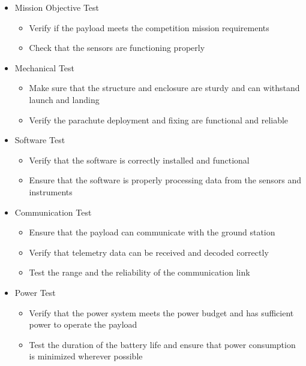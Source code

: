 \documentclass[11pt]{article}
\begin{document}
\begin{itemize}[leftmargin=1cm, itemindent=0.25cm, noitemsep, topsep=0pt, label=]
\item Mission Objective Test
\begin{itemize}[label=, noitemsep, topsep=2pt]
\item Verify if the payload meets the competition mission requirements
\item Check that the sensors are functioning properly
\end{itemize}

\item Mechanical Test
\begin{itemize}[label=, noitemsep, topsep=2pt]
\item Make sure that the structure and enclosure are sturdy and can withstand launch and landing
\item Verify the parachute deployment and fixing are functional and reliable
\end{itemize}

\item Software Test
\begin{itemize}[label=, noitemsep, topsep=2pt]
\item Verify that the software is correctly installed and functional
\item Ensure that the software is properly processing data from the sensors and instruments
\end{itemize}

\item Communication Test
\begin{itemize}[label=, noitemsep, topsep=2pt]
\item Ensure that the payload can communicate with the ground station
\item Verify that telemetry data can be received and decoded correctly
\item Test the range and the reliability of the communication link
\end{itemize}

\item Power Test
\begin{itemize}[label=, noitemsep, topsep=2pt]
\item Verify that the power system meets the power budget and has sufficient power to operate the payload
\item Test the duration of the battery life and ensure that power consumption is minimized wherever possible
\end{itemize}


\end{itemize}
\end{document}

